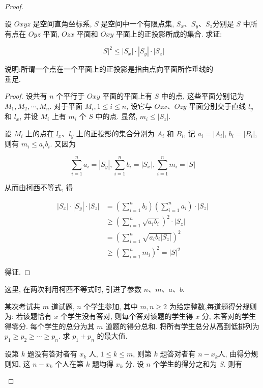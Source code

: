 \begin{proof}
\begin{example}
\begin{solution}
\begin{note}
\begin{example}
	设 $O x y z$ 是空间直角坐标系, $S$ 是空间中一个有限点集, $S_{x} 、 S_{y} 、 S_{z}$分别是 $S$ 中所有点在 $O y z$ 平面, $O z x$ 平面和 $O x y$ 平面上的正投影所成的集合. 求证:
	
	$$
	|S|^{2} \leqslant\left|S_{x}\right| \cdot\left|S_{y}\right| \cdot\left|S_{z}\right|
	$$
	
	说明:所谓一个点在一个平面上的正投影是指由点向平面所作垂线的\\
	垂足.
\end{example}
\begin{proof}
	设共有 $n$ 个平行于 $O x y$ 平面的平面上有 $S$ 中的点, 这些平面分别记为 $M_{1}, M_{2}, \cdots, M_{n}$. 对于平面 $M_{i}, 1 \leqslant i \leqslant n$, 设它与 $O z x 、 O z y$ 平面分别交于直线 $l_{y}$ 和 $l_{x}$, 并设 $M_{i}$ 上有 $m_{i}$ 个 $S$ 中的点. 显然, $m_{i} \leqslant\left|S_{z}\right|$.
	
	设 $M_{i}$ 上的点在 $l_{x} 、 l_{y}$ 上的正投影的集合分别为 $A_{i}$ 和 $B_{i}$, 记 $a_{i}=\left|A_{i}\right|$, $b_{i}=\left|B_{i}\right|$, 则有 $m_{i} \leqslant a_{i} b_{i}$. 又因为
	
	$$
	\sum_{i=1}^{n} a_{i}=\left|S_{y}\right|, \sum_{i=1}^{n} b_{i}=\left|S_{x}\right|, \sum_{i=1}^{n} m_{i}=|S|
	$$
	
	从而由柯西不等式, 得
	
	$$
	\begin{aligned}
	\left|S_{x}\right| \cdot\left|S_{y}\right| \cdot\left|S_{z}\right| & =\left(\sum_{i=1}^{n} b_{i}\right)\left(\sum_{i=1}^{n} a_{i}\right) \cdot\left|S_{z}\right| \\
	& \geqslant\left(\sum_{i=1}^{n} \sqrt{a_{i} b_{i}}\right)^{2} \cdot\left|S_{z}\right| \\
	& =\left(\sum_{i=1}^{n} \sqrt{a_{i} b_{i}\left|S_{z}\right|}\right)^{2} \\
	& \geqslant\left(\sum_{i=1}^{n} m_{i}\right)^{2}=|S|^{2}
	\end{aligned}
	$$
	
	得证.
\end{proof}
\begin{note}
	这里, 在两次利用柯西不等式时, 引进了参数 $n 、 m 、 a 、 b$.
\end{note}

\begin{example}
	某次考试共 $m$ 道试题, $n$ 个学生参加, 其中 $m, n \geqslant 2$ 为给定整数,每道题得分规则为: 若该题恰有 $x$ 个学生没有答对, 则每个答对该题的学生得 $x$ 分, 未答对的学生得零分. 每个学生的总分为其 $m$ 道题的得分总和. 将所有学生总分从高到低排列为 $p_{1} \geqslant p_{2} \geqslant \cdots \geqslant p_{n}$. 求 $p_{1}+p_{n}$ 的最大值.
\end{example}
\begin{solution}
	设第 $k$ 题没有答对者有 $x_{k}$ 人, $1 \leqslant k \leqslant m$, 则第 $k$ 题答对者有 $n-x_{k}$人, 由得分规则知, 这 $n-x_{k}$ 个人在第 $k$ 题均得 $x_{k}$ 分. 设 $n$ 个学生的得分之和为 $S$. 则有
	

\end{solution}
\end{note}
\end{solution}
\end{example}
\end{proof}
